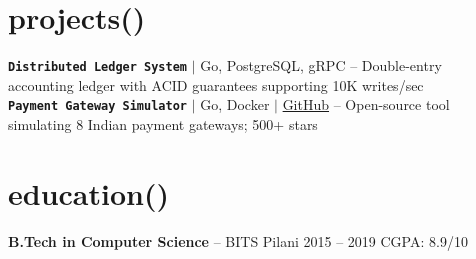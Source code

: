 \documentclass[10pt,a4paper]{article}
\begin{document}
\section{projects()}

\textbf{\texttt{Distributed Ledger System}} {\small$|$ Go, PostgreSQL, gRPC} -- Double-entry accounting ledger with ACID guarantees supporting 10K writes/sec\\[2pt]
\textbf{\texttt{Payment Gateway Simulator}} {\small$|$ Go, Docker $|$ \href{https://github.com/priyasharma/pg-simulator}{\color{accent}GitHub}} -- Open-source tool simulating 8 Indian payment gateways; 500+ stars

\section{education()}

\textbf{B.Tech in Computer Science} -- BITS Pilani \hfill 2015 -- 2019 \quad CGPA: 8.9/10
\end{document}
